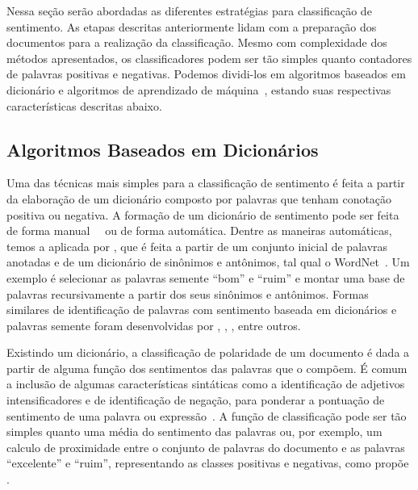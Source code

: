Nessa seção serão abordadas as diferentes estratégias para classificação de
sentimento.
As etapas descritas anteriormente lidam com a preparação dos documentos para
a realização da classificação.
Mesmo com complexidade dos métodos apresentados, os classificadores podem ser
tão simples quanto contadores de palavras positivas e negativas.
Podemos dividi-los em algoritmos baseados em dicionário e algoritmos de
aprendizado de máquina~\cite{taboada11}, estando suas respectivas
características descritas abaixo.

\subsection{Algoritmos Baseados em Dicionários} \label{sec:dictionary}

Uma das técnicas mais simples para a classificação de sentimento é feita a partir
da elaboração de um dicionário composto por palavras que tenham conotação
positiva ou negativa.
A formação de um dicionário de sentimento pode ser feita de forma
manual~\cite{stone66}~\cite{tong01} ou de forma automática.
Dentre as maneiras automáticas, temos a aplicada por \citet{hu04}, que é feita a
partir de um conjunto inicial de palavras anotadas e de um dicionário de
sinônimos e antônimos, tal qual o WordNet~\cite{miller90}.
Um exemplo é selecionar as palavras semente ``bom'' e ``ruim'' e montar uma base de
palavras recursivamente a partir dos seus sinônimos e antônimos.
Formas similares de identificação de palavras com sentimento baseada em
dicionários e palavras semente foram desenvolvidas por \citet{blair08},
\citet{rao09}, \citet{hassan10}, entre outros.

Existindo um dicionário, a classificação de polaridade de um documento é dada
a partir de alguma função dos sentimentos das palavras que o compõem.
É comum a inclusão de algumas características sintáticas como a identificação de
adjetivos intensificadores e de identificação de negação, para ponderar a pontuação
de sentimento de uma palavra ou expressão~\cite{taboada11}.
A função de classificação pode ser tão simples quanto uma média do sentimento
das palavras ou, por exemplo, um calculo de proximidade entre o conjunto de
palavras do documento e as palavras ``excelente'' e ``ruim'', representando as
classes positivas e negativas, como propõe \citet{turney02}.


